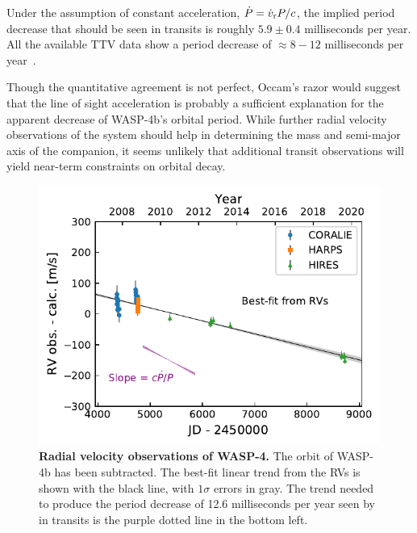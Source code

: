 \documentclass[12pt,twocolumn,tighten]{aastex62}
\begin{document}
Under the assumption of constant acceleration, $\dot{P} = \dot{v}_{\rm
r} P / c$, the implied period decrease that should be seen in
transits is roughly $5.9 \pm 0.4$ milliseconds per year.  All the
available TTV data show a period decrease of $\approx 8-12$
milliseconds per year~\citep{bouma_wasp-4b_2019,southworth_transit_2019,baluev_homogeneously_2019}.

Though the quantitative agreement is not perfect, Occam's razor would
suggest that the line of sight acceleration is probably a sufficient
explanation for the apparent decrease of WASP-4b's orbital period.
While further radial velocity observations of the system should help
in determining the mass and semi-major axis of the companion, it seems
unlikely that additional transit observations will yield near-term
constraints on orbital decay.



\begin{figure}
    \begin{center}
		\includegraphics{rv_fit.pdf}
    \end{center}
    \vspace{-0.8cm}
    \caption{
      {\bf Radial velocity observations of WASP-4.}
      The orbit of WASP-4b has been subtracted.  The best-fit linear
      trend from the RVs is shown with the black line, with $1\sigma$
      errors in gray. The trend needed to produce the period decrease
      of 12.6 milliseconds per year seen by \citet{bouma_wasp-4b_2019}
      in transits is the purple dotted line in the bottom left.
     \label{fig:rv_o_minus_c}
    }
\end{figure}
\end{document}

